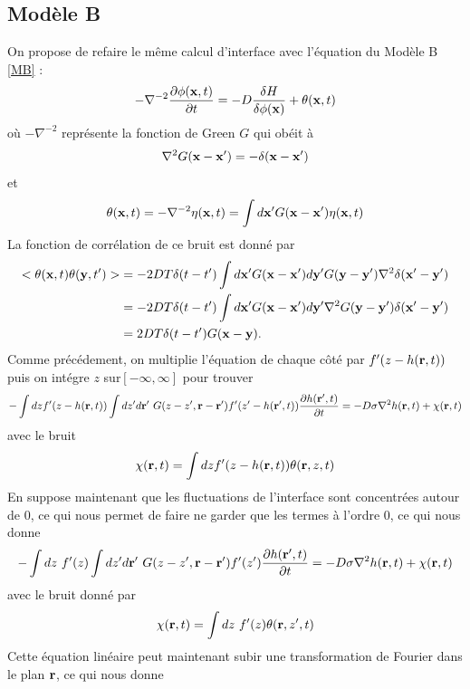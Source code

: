     \subsection{Modèle B}
On propose de refaire le même calcul d'interface avec l'équation du Modèle B \ref{MB} :
\begin{align}
    -\nabla^{-2} \frac{\partial\phi({\bf x},t)}{\partial t} = -D \frac{\delta H}{\delta \phi({\bf x})}+ \theta({\bf x},t)
\end{align}
où $-\nabla^{-2}$ représente la fonction de Green $G$ qui obéit à
\begin{align}
    \nabla^2 G({\bf x}-{\bf x'}) = -\delta({\bf x}-{\bf x}')
\end{align}
et
\begin{align}
    \theta({\bf x},t)=-\nabla^{-2}\eta({\bf x},t)= \int d{\bf x}'G({\bf x}-{\bf x'})\eta({\bf x},t)
\end{align}
La fonction de corrélation de ce bruit est donné par 
\begin{align}
< \theta({\bf x},t)\theta({\bf y},t')> &=-2DT\delta(t-t') \int d{\bf x}'G({\bf x}-{\bf x'})d{\bf y}'G({\bf y}-{\bf y'})\nabla^2\delta({\bf x}'-{\bf y}') \nonumber \\
&= -2DT\delta(t-t') \int d{\bf x}'G({\bf x}-{\bf x'})d{\bf y}'\nabla^2G({\bf y}-{\bf y'})\delta({\bf x}'-{\bf y}') \nonumber \\
&= 2DT\delta(t-t') G({\bf x}-{\bf y}).
\end{align}
Comme précédement, on multiplie l'équation de chaque côté par $f'(z-h({\bf r},t))$ puis on intégre $z$ sur$[-\infty,\infty]$ pour trouver 
\begin{align}
-\int dz f'(z-h({\bf r},t))\int dz'd{\bf r}'\  G(z-z',{\bf r}-{\bf r}') f'(z'-h({\bf r}',t))\frac{\partial h({\bf r}',t)}{\partial t} = -D\sigma \nabla^2 h({\bf r},t) + \chi({\bf r},t)
\end{align}
avec le bruit
\begin{align}
    \chi({\bf r},t)= \int dz f'(z-h({\bf r},t)) \theta({\bf r},z,t)
\end{align}
En suppose maintenant que les fluctuations de l'interface sont concentrées autour de $0$, ce qui nous permet de faire ne garder que les termes à l'ordre $0$, ce qui nous donne
\begin{align}
    -\int dz \ f'(z)\int dz'd{\bf r}'\  G(z-z',{\bf r}-{\bf r}') f'(z')\frac{\partial h({\bf r}',t)}{\partial t} = -D\sigma \nabla^2 h({\bf r},t) + \chi({\bf r},t)
\end{align}
avec le bruit donné par 
\begin{align}
    \chi({\bf r},t)= \int dz\  f'(z) \theta({\bf r},z',t)
\end{align}
Cette équation linéaire peut maintenant subir une transformation de Fourier dans le plan ${\bf r}$, ce qui nous donne
